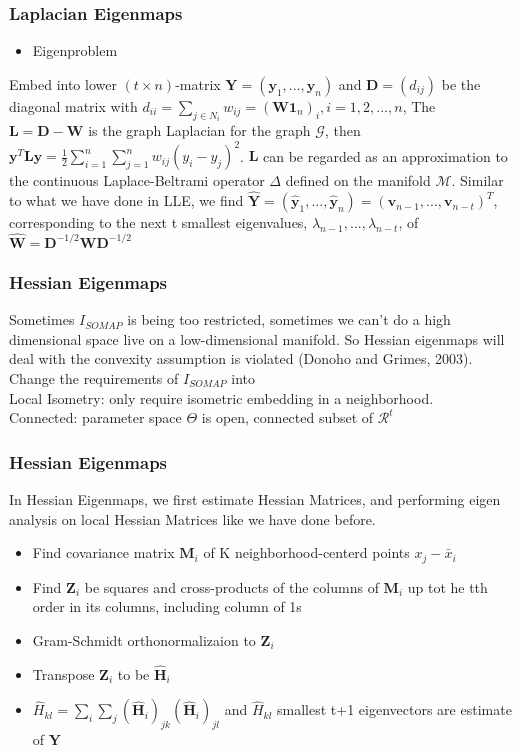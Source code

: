 \documentclass{beamer}
\begin{document}
\begin{frame}
\frametitle{Laplacian Eigenmaps}
\begin{itemize}
\item{Eigenproblem}
\end{itemize}
Embed into lower $(t \times n)$-matrix $\textbf{Y}=(\textbf{y}_1,...,\textbf{y}_n)$ and $\textbf{D}=(d_{ij})$ be the diagonal matrix  with $d_{ii}=\sum_{j \in N_{i}}w_{ij}=(\textbf{W}\textbf{1}_n)_i, i=1,2,...,n$, The $\textbf{L}=\textbf{D}-\textbf{W}$ is the graph Laplacian for the graph $\mathcal{G}$, then $\textbf{y}^T\textbf{L}\textbf{y}=\frac{1}{2}\sum_{i=1}^n\sum_{j=1}^n w_{ij}(y_i-y_j)^2$. $\textbf{L}$ can be regarded as an approximation to the continuous Laplace-Beltrami operator $\Delta$ defined on the manifold $\mathcal{M}$.
Similar to what we have done in LLE, we find $\hat{\textbf{Y}}=(\hat{\textbf{y}}_1,...,\hat{\textbf{y}}_n)=(\textbf{v}_{n-1},...,\textbf{v}_{n-t})^T$, corresponding to the next t smallest eigenvalues, $\lambda_{n-1},...,\lambda_{n-t}$, of $\hat{\textbf{W}}=\textbf{D}^{-1/2}\textbf{W}\textbf{D}^{-1/2}$
\end{frame}

\begin{frame}
\frametitle{Hessian Eigenmaps}
Sometimes $I_{SOMAP}$ is being too restricted, sometimes we can't do a high dimensional space live on a low-dimensional manifold. So Hessian eigenmaps  will deal with the convexity assumption is violated (Donoho and Grimes, 2003).\\
Change the requirements of $I_{SOMAP}$ into\\
Local Isometry: only require isometric embedding in a neighborhood.\\
Connected: parameter space $\Theta$ is open, connected subset of $\mathcal{R}^t$
\end{frame}

\begin{frame}
\frametitle{Hessian Eigenmaps}
In Hessian Eigenmaps, we first estimate Hessian Matrices, and performing eigen analysis on local Hessian Matrices like we have done before.
\begin{itemize}
\item{Find covariance matrix $\textbf{M}_i$ of K neighborhood-centerd points $x_j-\bar{x}_i$}
\item{Find $\textbf{Z}_i$ be squares and cross-products of the columns of $\textbf{M}_i$ up tot he tth order in its columns, including column of 1s}
\item{Gram-Schmidt orthonormalizaion to $\textbf{Z}_i$}
\item{Transpose $\textbf{Z}_i$ to be $\hat{\textbf{H}}_i$}
\item{$\hat{H}_{kl}=\sum_i\sum_j(\hat{\textbf{H}}_i)_{jk}(\hat{\textbf{H}}_i)_{jl}$ and $\hat{H}_{kl}$ smallest t+1 eigenvectors are estimate of $\textbf{Y}$}
\end{itemize}
\end{frame}
\end{document}

